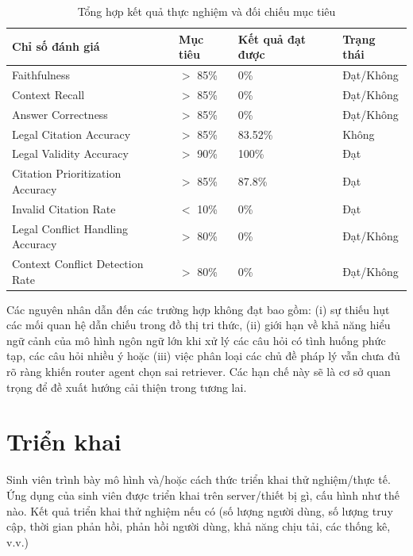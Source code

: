 \documentclass[../DoAn.tex]{subfiles}
\begin{document}
\begin{table}[H]
\centering
\begin{tabular}{|l|l|l|l|}
\hline
\textbf{Chỉ số đánh giá} & \textbf{Mục tiêu} & \textbf{Kết quả đạt được} & \textbf{Trạng thái} \\ \hline
Faithfulness & $>$ 85\% & 0\% & Đạt/Không \\ \hline
Context Recall & $>$ 85\% & 0\% & Đạt/Không \\ \hline
Answer Correctness & $>$ 85\% & 0\% & Đạt/Không \\ \hline
Legal Citation Accuracy & $>$ 85\% & 83.52\% & Không \\ \hline
Legal Validity Accuracy & $>$ 90\% & 100\% & Đạt \\ \hline
Citation Prioritization Accuracy & $>$ 85\% & 87.8\% & Đạt \\ \hline
Invalid Citation Rate & $<$ 10\% & 0\% & Đạt \\ \hline
Legal Conflict Handling Accuracy & $>$ 80\% & 0\% & Đạt/Không \\ \hline
Context Conflict Detection Rate  & $>$ 80\% & 0\% & Đạt/Không \\ \hline
\end{tabular}
\caption{Tổng hợp kết quả thực nghiệm và đối chiếu mục tiêu}
\end{table}

Các nguyên nhân dẫn đến các trường hợp không đạt bao gồm: (i) sự thiếu hụt các mối quan hệ dẫn chiếu trong đồ thị tri thức, (ii) giới hạn về khả năng hiểu ngữ cảnh của mô hình ngôn ngữ lớn khi xử lý các câu hỏi có tình huống phức tạp, các câu hỏi nhiều ý hoặc (iii) việc phân loại các chủ đề pháp lý vẫn chưa đủ rõ ràng khiến router agent chọn sai retriever. Các hạn chế này sẽ là cơ sở quan trọng để đề xuất hướng cải thiện trong tương lai.

\section{Triển khai}
Sinh viên trình bày mô hình và/hoặc cách thức triển khai thử nghiệm/thực tế. Ứng dụng của sinh viên được triển khai trên server/thiết bị gì, cấu hình như thế nào. Kết quả triển khai thử nghiệm nếu có (số lượng người dùng, số lượng truy cập, thời gian phản hồi, phản hồi người dùng, khả năng chịu tải, các thống kê, v.v.)
\end{document}
